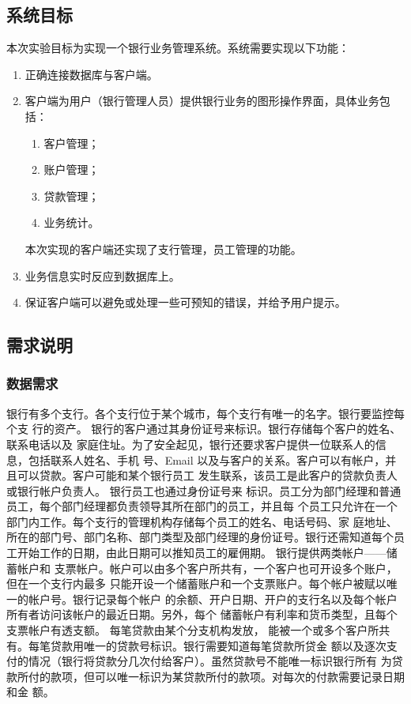 \documentclass{ctexart}
\begin{document}
\subsection{\hei 系统目标}
本次实验目标为实现一个银行业务管理系统。系统需要实现以下功能：
\begin{enumerate}
    \item 正确连接数据库与客户端。
    \item 客户端为用户（银行管理人员）提供银行业务的图形操作界面，具体业务包括：
    \begin{enumerate}
        \item 客户管理；
        \item 账户管理；
        \item 贷款管理；
        \item 业务统计。
    \end{enumerate}
    本次实现的客户端还实现了支行管理，员工管理的功能。
    \item 业务信息实时反应到数据库上。
    \item 保证客户端可以避免或处理一些可预知的错误，并给予用户提示。
\end{enumerate}
\subsection{\hei 需求说明}
\subsubsection{\hei 数据需求}
银行有多个支行。各个支行位于某个城市，每个支行有唯一的名字。银行要监控每个支
行的资产。 银行的客户通过其身份证号来标识。银行存储每个客户的姓名、联系电话以及
家庭住址。为了安全起见，银行还要求客户提供一位联系人的信息，包括联系人姓名、手机
号、Email 以及与客户的关系。客户可以有帐户，并且可以贷款。客户可能和某个银行员工
发生联系，该员工是此客户的贷款负责人或银行帐户负责人。 银行员工也通过身份证号来
标识。员工分为部门经理和普通员工，每个部门经理都负责领导其所在部门的员工，并且每
个员工只允许在一个部门内工作。每个支行的管理机构存储每个员工的姓名、电话号码、家
庭地址、所在的部门号、部门名称、部门类型及部门经理的身份证号。银行还需知道每个员
工开始工作的日期，由此日期可以推知员工的雇佣期。 银行提供两类帐户——储蓄帐户和
支票帐户。帐户可以由多个客户所共有，一个客户也可开设多个账户，但在一个支行内最多
只能开设一个储蓄账户和一个支票账户。每个帐户被赋以唯一的帐户号。银行记录每个帐户
的余额、开户日期、开户的支行名以及每个帐户所有者访问该帐户的最近日期。另外，每个
储蓄帐户有利率和货币类型，且每个支票帐户有透支额。 每笔贷款由某个分支机构发放，
能被一个或多个客户所共有。每笔贷款用唯一的贷款号标识。银行需要知道每笔贷款所贷金
额以及逐次支付的情况（银行将贷款分几次付给客户）。虽然贷款号不能唯一标识银行所有
为贷款所付的款项，但可以唯一标识为某贷款所付的款项。对每次的付款需要记录日期和金
额。
\end{document}
